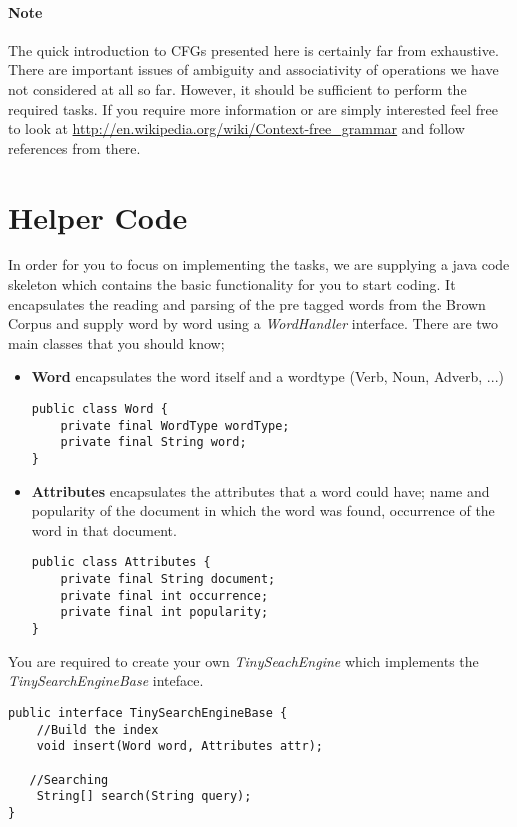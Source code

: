 \documentclass[11pt]{article}
\begin{document}
\paragraph{Note} The quick introduction to CFGs presented here is certainly far from exhaustive. There are important issues of ambiguity and associativity of operations we have not considered at all so far. However, it should be sufficient to perform the required tasks. If you require more information or are simply interested feel free to look at \url{http://en.wikipedia.org/wiki/Context-free_grammar} and follow references from there.

\section{Helper Code}
In order for you to focus on implementing the tasks, we are supplying a java code skeleton which contains the basic functionality for you to start coding. It encapsulates the reading and parsing of the pre tagged words from the Brown Corpus and supply word by word using a \textit{WordHandler} interface. There are two main classes that you should know; 
\begin{itemize}
\item \textbf{Word} encapsulates the word itself and a wordtype (Verb, Noun, Adverb, ...)

\begin{lstlisting}
public class Word {
    private final WordType wordType;
    private final String word;
}
\end{lstlisting}

\item \textbf{Attributes} encapsulates the attributes that a word could have; name and popularity of the document in which the word was found, occurrence of the word in that document.
\begin{lstlisting}
public class Attributes {
    private final String document;
    private final int occurrence;
    private final int popularity;
}
\end{lstlisting}
\end{itemize}

You are required to create your own \textit{TinySeachEngine} which implements the \textit{TinySearchEngineBase} inteface.

\begin{lstlisting}
public interface TinySearchEngineBase {
    //Build the index
    void insert(Word word, Attributes attr);
        
   //Searching
    String[] search(String query);
}
\end{lstlisting}
\end{document}
